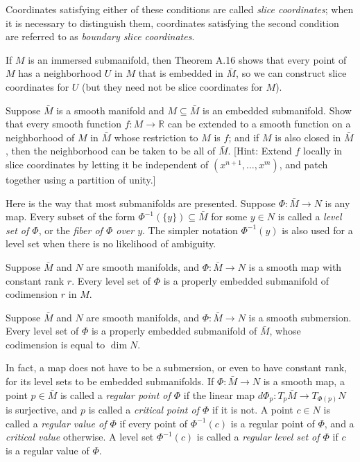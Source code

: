 Coordinates satisfying either of these conditions are called \emph{slice coordinates}; when it is necessary to distinguish them, coordinates satisfying the second condition are referred to as \emph{boundary slice coordinates}.

If $M$ is an immersed submanifold, then Theorem A.16 shows that every point of $M$ has a neighborhood $U$ in $M$ that is embedded in $\bar{M}$, so we can construct slice coordinates for $U$ (but they need not be slice coordinates for $M$).

\begin{exercise}
\label{exer:extension-smooth-function}
Suppose $\bar{M}$ is a smooth manifold and $M \subseteq \bar{M}$ is an embedded submanifold. Show that every smooth function $f : M \to \mathbb{R}$ can be extended to a smooth function on a neighborhood of $M$ in $\bar{M}$ whose restriction to $M$ is $f$; and if $M$ is also closed in $\bar{M}$, then the neighborhood can be taken to be all of $\bar{M}$. [Hint: Extend $f$ locally in slice coordinates by letting it be independent of $(x^{n+1},\ldots,x^m)$, and patch together using a partition of unity.]
\end{exercise}

Here is the way that most submanifolds are presented. Suppose $\Phi: \bar{M} \to N$ is any map. Every subset of the form $\Phi^{-1}(\{y\}) \subseteq \bar{M}$ for some $y \in N$ is called a \emph{level set of $\Phi$}, or the \emph{fiber of $\Phi$ over $y$}. The simpler notation $\Phi^{-1}(y)$ is also used for a level set when there is no likelihood of ambiguity.

\begin{theorem}
\label{thm:constant-rank-level-set}
Suppose $\bar{M}$ and $N$ are smooth manifolds, and $\Phi: \bar{M} \to N$ is a smooth map with constant rank $r$. Every level set of $\Phi$ is a properly embedded submanifold of codimension $r$ in $M$.
\end{theorem}

\begin{corollary}
\label{cor:submersion-level-set}
Suppose $\bar{M}$ and $N$ are smooth manifolds, and $\Phi: \bar{M} \to N$ is a smooth submersion. Every level set of $\Phi$ is a properly embedded submanifold of $\bar{M}$, whose codimension is equal to $\dim N$.
\end{corollary}

In fact, a map does not have to be a submersion, or even to have constant rank, for its level sets to be embedded submanifolds. If $\Phi: \bar{M} \to N$ is a smooth map, a point $p \in \bar{M}$ is called a \emph{regular point of $\Phi$} if the linear map $d\Phi_p: T_p \bar{M} \to T_{\Phi(p)} N$ is surjective, and $p$ is called a \emph{critical point of $\Phi$} if it is not. A point $c \in N$ is called a \emph{regular value of $\Phi$} if every point of $\Phi^{-1}(c)$ is a regular point of $\Phi$, and a \emph{critical value} otherwise. A level set $\Phi^{-1}(c)$ is called a \emph{regular level set of $\Phi$} if $c$ is a regular value of $\Phi$.

